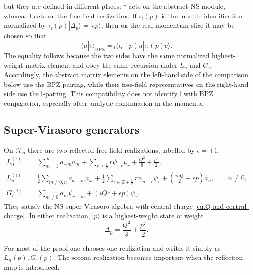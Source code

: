 \documentclass[11pt]{article}
\newcommand{\cH}{\mathcal H}
\newcommand{\Ibra}[1]{{}_{\mathsf I}\!\langle #1|}
\begin{document}
but they are defined in different places: \(\dagger\) acts on the abstract
NS module, whereas \(\mathsf I\) acts on the free-field realization.  If
\(\iota_\epsilon(p)\) is the module identification normalized by
\(\iota_\epsilon(p)|\Delta_p\rangle=|\epsilon p\rangle\), then on the real
momentum slice it may be chosen so that
\begin{equation}
 \langle u|v\rangle_{\mathrm{BPZ}}
 =
 \Ibra{\iota_\epsilon(p)u}
 \iota_\epsilon(p)v\rangle.
 \label{eq:BPZ-I-pairing-identification}
\end{equation}
The equality follows because the two sides have the same normalized
highest-weight matrix element and obey the same recursion under
\(L_n\) and \(G_r\).  Accordingly, the abstract matrix elements on the
left-hand side of the comparison below use the BPZ pairing, while their
free-field representatives on the right-hand side use the
\(\mathsf I\)-pairing.  This compatibility does not identify
\(\mathsf I\) with BPZ conjugation, especially after analytic continuation
in the momenta.

\subsection{Super-Virasoro generators}

On \(\cH_p\) there are two reflected free-field realizations, labelled by
\(\epsilon=\pm1\):
\begin{align}
 L_0^{(\epsilon)}
 &=
 \sum_{m=1}^{\infty}a_{-m}a_m
 +\sum_{r\geq\frac12}r\psi_{-r}\psi_r
 +\frac{Q^2}{8}+\frac{p^2}{2},
 \label{eq:L0-free-field}
 \\
 L_n^{(\epsilon)}
 &=
 \frac12\sum_{m\neq0,n}a_{n-m}a_m
 +\frac12\sum_{r\in\mathbb Z+\frac12}r\psi_{n-r}\psi_r
 +\left(\frac{i nQ}{2}+\epsilon p\right)a_n,
 \qquad n\neq0,
 \label{eq:Ln-free-field}
 \\
 G_r^{(\epsilon)}
 &=
 \sum_{m\neq0}a_m\psi_{r-m}
 +\left(iQr+\epsilon p\right)\psi_r.
 \label{eq:Gr-free-field}
\end{align}
They satisfy the NS super-Virasoro algebra with central charge
\eqref{eq:Q-and-central-charge}.  In either realization, \(\lvert p\rangle\)
is a highest-weight state of weight
\begin{equation}
 \Delta_p=\frac{Q^2}{8}+\frac{p^2}{2}.
 \label{eq:Delta-p}
\end{equation}

For most of the proof one chooses one realization and writes it simply as
\(L_n(p),G_r(p)\).  The second realization becomes important when the
reflection map is introduced.
\end{document}
